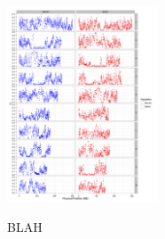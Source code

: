 %
%
%
%
%



\begin{figure}[tb]   
  \begin{center}
   \vspace{-0mm}
   \includegraphics[width=0.4\textwidth]{fig3}
   \renewcommand{\baselinestretch}{0.9}
   \vspace{-3mm}
   \caption{BLAH} 
\vspace{-6mm}
    \label{fig:heterotic}
  \end{center}
\end{figure}

